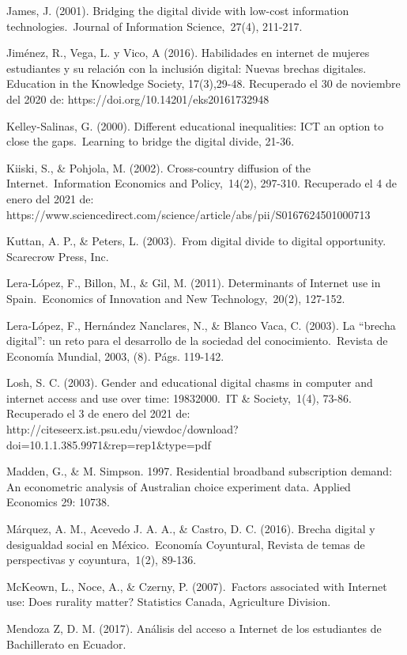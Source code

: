 James, J. (2001). Bridging the digital divide with low-cost information
technologies.~Journal of Information Science,~27(4), 211-217.

Jiménez, R., Vega, L. y Vico, A (2016). Habilidades en internet de
mujeres estudiantes y su relación con la inclusión digital: Nuevas
brechas digitales. Education in the Knowledge Society, 17(3),29-48.
Recuperado el 30 de noviembre del 2020 de:
https://doi.org/10.14201/eks20161732948

Kelley-Salinas, G. (2000). Different educational inequalities: ICT an
option to close the gaps.~Learning to bridge the digital divide, 21-36.

Kiiski, S., \& Pohjola, M. (2002). Cross-country diffusion of the
Internet.~Information Economics and Policy,~14(2), 297-310. Recuperado
el 4 de enero del 2021 de:
https://www.sciencedirect.com/science/article/abs/pii/S0167624501000713

Kuttan, A. P., \& Peters, L. (2003).~From digital divide to digital
opportunity. Scarecrow Press, Inc.

Lera-López, F., Billon, M., \& Gil, M. (2011). Determinants of Internet
use in Spain.~Economics of Innovation and New Technology,~20(2),
127-152.

Lera-López, F., Hernández Nanclares, N., \& Blanco Vaca, C. (2003). La
``brecha digital'': un reto para el desarrollo de la sociedad del
conocimiento.~Revista de Economía Mundial, 2003, (8). Págs. 119-142.

Losh, S. C. (2003). Gender and educational digital chasms in computer
and internet access and use over time: 19832000.~IT \& Society,~1(4),
73-86. Recuperado el 3 de enero del 2021 de:
http://citeseerx.ist.psu.edu/viewdoc/download?doi=10.1.1.385.9971\&rep=rep1\&type=pdf

Madden, G., \& M. Simpson. 1997. Residential broadband subscription
demand: An econometric analysis of Australian choice experiment data.
Applied Economics 29: 10738.

Márquez, A. M., Acevedo J. A. A., \& Castro, D. C. (2016). Brecha
digital y desigualdad social en México.~Economía Coyuntural, Revista de
temas de perspectivas y coyuntura,~1(2), 89-136.

McKeown, L., Noce, A., \& Czerny, P. (2007).~Factors associated with
Internet use: Does rurality matter? Statistics Canada, Agriculture
Division.

Mendoza Z, D. M. (2017). Análisis del acceso a Internet de los
estudiantes de Bachillerato en Ecuador.

